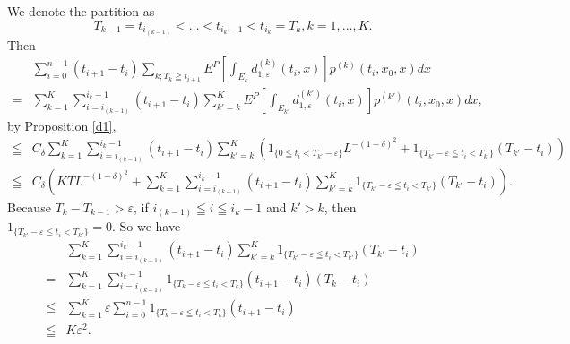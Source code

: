 \documentclass[12pt]{article}
\begin{document}
We denote the partition as $$T_{k-1} = t_{i_{(k-1)}} < \ldots < t_{i_k-1} < t_{i_k}=T_k, k=1,\ldots,K.$$
Then
\begin{align*}
&\sum_{i=0}^{n-1} (t_{i+1}-t_i) \sum_{k; T_k \geqq t_{i+1}} E^P[\int_{E_k} d_{1,\varepsilon}^{(k)}(t_i,x)] p^{(k)}(t_i, x_0, x)dx \\
=&\sum_{k=1}^K \sum_{i=i_{(k-1)}}^{i_{k}-1} (t_{i+1}-t_i) \sum_{k'=k}^K E^P[\int_{E_{k'}} d_{1,\varepsilon}^{(k')}(t_i,x)] p^{(k')}(t_i, x_0, x)dx ,
\end{align*}
by Proposition \ref{d1},
\begin{align*}
\leqq &C_{\delta} \sum_{k=1}^K \sum_{i=i_{(k-1)}}^{i_{k}-1} (t_{i+1}-t_i) \sum_{k'=k}^K  \left( 1_{\{ 0\leqq t_i < T_{k'}- \varepsilon \}}L^{-(1-\delta)^2
}+1_{\{ T_{k'}- \varepsilon \leqq t_i <  T_{k'}\}}(T_{k'}-t_i) \right)\\
\leqq& C_{\delta}\left( KT L^{-(1-\delta)^2}
+\sum_{k=1}^K \sum_{i=i_{(k-1)}}^{i_{k}-1}  (t_{i+1}-t_i) \sum_{k'=k}^K1_{\{ T_{k'}- \varepsilon \leqq t_i <  T_{k'}\}}(T_{k'}-t_i) \right).
\end{align*}
Because $T_k-T_{k-1} >\varepsilon$, if $i_{(k-1)} \leqq i \leqq i_{k}-1$ and $k' >k$, then $1_{\{ T_{k'}- \varepsilon \leqq t_i <  T_{k'}\}}=0.$
 So we have
\begin{align*}
&\sum_{k=1}^K \sum_{i=i_{(k-1)}}^{i_{k}-1}  (t_{i+1}-t_i) \sum_{k'=k}^K1_{\{ T_{k'}- \varepsilon \leqq t_i <  T_{k'}\}}(T_{k'}-t_i) \\
=&\sum_{k=1}^K \sum_{i=i_{(k-1)}}^{i_{k}-1}  1_{\{ T_k- \varepsilon \leqq t_i <  T_k\}} (t_{i+1}-t_i)(T_k-t_i) \\
\leqq &\sum_{k=1}^K \varepsilon \sum_{i=0}^{n-1}1_{\{ T_k- \varepsilon \leqq t_i <  T_k\}} (t_{i+1}-t_i)\\
\leqq &K \varepsilon^2.
\end{align*}
\end{document}
